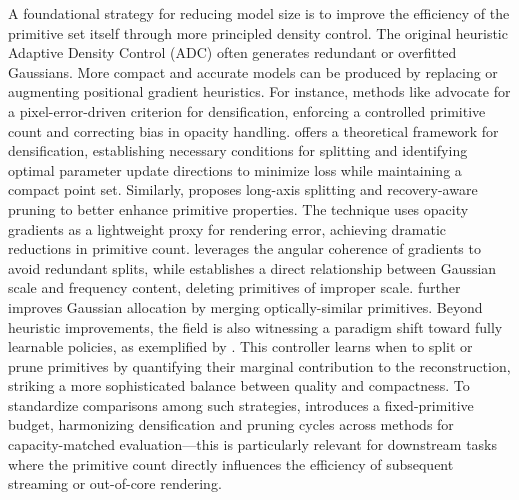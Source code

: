 \documentclass[11pt,a4paper]{article}
\begin{document}
A foundational strategy for reducing model size is to improve the efficiency of the primitive set itself through more principled density control. The original heuristic Adaptive Density Control (ADC) often generates redundant or overfitted Gaussians. More compact and accurate models can be produced by replacing or augmenting positional gradient heuristics. For instance, methods like \cite{arxiv:2404.06109v1} advocate for a pixel-error-driven criterion for densification, enforcing a controlled primitive count and correcting bias in opacity handling. \cite{arxiv:2505.05587v1} offers a theoretical framework for densification, establishing necessary conditions for splitting and identifying optimal parameter update directions to minimize loss while maintaining a compact point set. Similarly, \cite{arxiv:2411.10133v4} proposes long-axis splitting and recovery-aware pruning to better enhance primitive properties. The \cite{arxiv:2510.10257v1} technique uses opacity gradients as a lightweight proxy for rendering error, achieving dramatic reductions in primitive count. \cite{arxiv:2510.26921v1} leverages the angular coherence of gradients to avoid redundant splits, while \cite{arxiv:2503.07000v1} establishes a direct relationship between Gaussian scale and frequency content, deleting primitives of improper scale. \cite{arxiv:2607.17896v1} further improves Gaussian allocation by merging optically-similar primitives. Beyond heuristic improvements, the field is also witnessing a paradigm shift toward fully learnable policies, as exemplified by \cite{arxiv:2605.00408v2}. This controller learns when to split or prune primitives by quantifying their marginal contribution to the reconstruction, striking a more sophisticated balance between quality and compactness. To standardize comparisons among such strategies, \cite{arxiv:2605.16158v1} introduces a fixed-primitive budget, harmonizing densification and pruning cycles across methods for capacity-matched evaluation---this is particularly relevant for downstream tasks where the primitive count directly influences the efficiency of subsequent streaming or out-of-core rendering.
\end{document}
